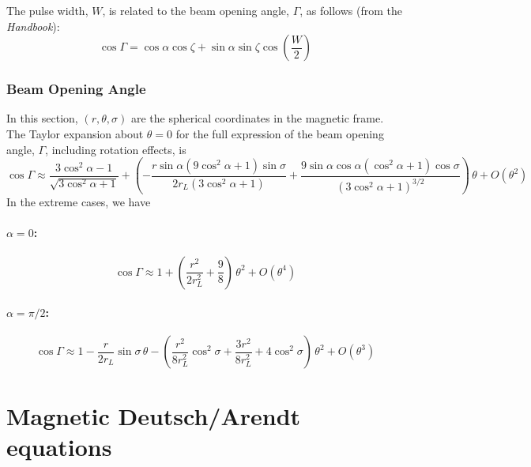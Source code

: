 \documentclass{article}
\begin{document}
The pulse width, $W$, is related to the beam opening angle, $\Gamma$, as follows (from the \emph{Handbook}):
\begin{equation}
    \cos\Gamma = \cos\alpha\cos\zeta + \sin\alpha\sin\zeta\cos\left(\frac{W}{2}\right)
    \tag{H3.27}
\end{equation}

\subsubsection{Beam Opening Angle}

In this section, $(r,\theta,\sigma)$ are the spherical coordinates in the magnetic frame.
The Taylor expansion about $\theta = 0$ for the full expression of the beam opening angle, $\Gamma$, including rotation effects, is
\begin{equation}
    \cos\Gamma \approx \frac{3\cos^2\alpha-1}{\sqrt{3\cos^2\alpha + 1}} +
                   \left(-\frac{r\sin\alpha(9\cos^2\alpha+1)\sin\sigma}{2r_L(3\cos^2\alpha + 1)} +
                          \frac{9\sin\alpha\cos\alpha(\cos^2\alpha+1)\cos\sigma}{(3\cos^2\alpha+1)^{3/2}}\right) \,\theta +
                   O(\theta^2)
\end{equation}
In the extreme cases, we have
\paragraph{$\alpha = 0$:}
\begin{equation}
    \cos\Gamma \approx 1 + \left(\frac{r^2}{2r_L^2} + \frac98\right)\,\theta^2 + O(\theta^4)
\end{equation}
\paragraph{$\alpha = \pi/2$:}
\begin{equation}
    \cos\Gamma \approx 1 - \frac{r}{2r_L}\sin\sigma\,\theta - \left(\frac{r^2}{8r_L^2}\cos^2\sigma + \frac{3r^2}{8r_L^2} + 4\cos^2\sigma\right)\,\theta^2 + O(\theta^3)
\end{equation}

\section{Magnetic Deutsch/Arendt equations}
\end{document}
